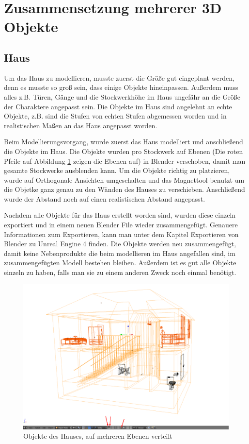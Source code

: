 \section{Zusammensetzung mehrerer 3D Objekte}
\subsection{Haus}
Um das Haus zu modellieren, musste zuerst die Größe gut eingeplant werden, denn es musste so groß sein, dass einige Objekte hineinpassen.
Außerdem muss alles z.B. Türen, Gänge und die Stockwerkhöhe im Haus ungefähr an die Größe der Charaktere angepasst sein.
Die Objekte im Haus sind angelehnt an echte Objekte, z.B. sind die Stufen von echten Stufen abgemessen worden und in realistischen Maßen an das Haus angepasst worden.

Beim Modellierungsvorgang, wurde zuerst das Haus modelliert und anschließend die Objekte im Haus. Die Objekte wurden pro Stockwerk auf Ebenen (Die roten Pfeile auf Abbildung \ref{Haus:image1} zeigen
die Ebenen auf) in Blender verschoben, damit man gesamte Stockwerke ausblenden kann. Um die Objekte richtig zu platzieren, wurde auf Orthogonale Ansichten umgeschalten
und das Magnettool benutzt um die Objetke ganz genau zu den Wänden des Hauses zu verschieben. Anschließend wurde der Abstand noch auf einen realistischen Abstand angepasst.

Nachdem alle Objekte für das Haus erstellt worden sind, wurden diese einzeln exportiert und in einem neuen Blender File wieder zusammengefügt. Genauere Informationen zum Exportieren, kann
man unter dem Kapitel Exportieren von Blender zu Unreal Engine 4 finden.  Die Objekte werden neu zusammengefügt, damit keine Nebenprodukte die beim modellieren
im Haus angefallen sind, im zusammengefügten Modell bestehen bleiben. Außerdem ist es gut alle Objekte einzeln zu haben, falls man sie zu einem anderen Zweck noch einmal benötigt.

\begin{figure}[h]
    \centering
    \includegraphics[width=.8\textwidth]{images/Haus-zusammenfuegen_Ebenen.png}
    \caption{Objekte des Hauses, auf mehreren Ebenen verteilt}
    \label{Haus:image1}
\end{figure}
